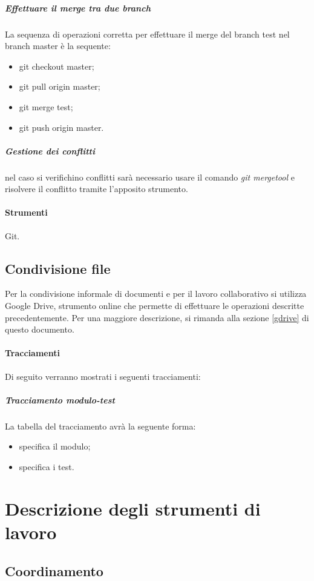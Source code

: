 \subparagraph{Effettuare il merge tra due branch}
\label{merge}
La sequenza di operazioni corretta per effettuare il merge del branch test nel branch master è la sequente:
\begin{itemize}
\item git checkout master;
\item git pull origin master;
\item git merge test;
\item git push origin master.
\end{itemize}

\subparagraph{Gestione dei conflitti} nel caso si verifichino conflitti sarà necessario usare il comando \textit{git mergetool} e risolvere il conflitto tramite l'apposito strumento.

\paragraph{Strumenti}
Git.


\subsection{Condivisione file}
Per la condivisione informale di documenti e per il lavoro collaborativo si utilizza Google Drive, strumento online che permette di effettuare le operazioni descritte precedentemente. Per una maggiore descrizione, si rimanda alla sezione \ref{gdrive} di questo documento.


\paragraph{Tracciamenti}
Di seguito verranno mostrati i seguenti tracciamenti:
\label{}

\subparagraph{Tracciamento modulo-test}
La tabella del tracciamento avrà la seguente forma:
\begin{itemize}
\item {}specifica il modulo;
\item {}specifica i test.
\end{itemize}



\appendix
\newpage
\section{Descrizione degli strumenti di lavoro}


\subsection{Coordinamento}

